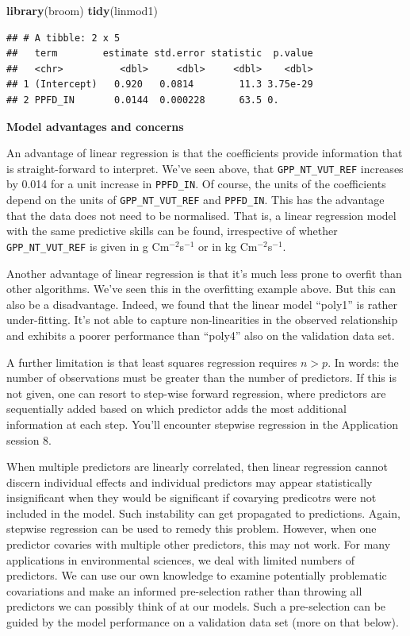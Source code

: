 \documentclass[
]{book}
\newenvironment{Shaded}{\begin{snugshade}}{\end{snugshade}}
\newcommand{\KeywordTok}[1]{\textcolor[rgb]{0.13,0.29,0.53}{\textbf{#1}}}
\newcommand{\NormalTok}[1]{#1}
\begin{document}
\begin{Shaded}
\begin{Highlighting}[]
\KeywordTok{library}\NormalTok{(broom)}
\KeywordTok{tidy}\NormalTok{(linmod1)}
\end{Highlighting}
\end{Shaded}

\begin{verbatim}
## # A tibble: 2 x 5
##   term        estimate std.error statistic  p.value
##   <chr>          <dbl>     <dbl>     <dbl>    <dbl>
## 1 (Intercept)   0.920   0.0814        11.3 3.75e-29
## 2 PPFD_IN       0.0144  0.000228      63.5 0.
\end{verbatim}

\textbf{Model advantages and concerns}

An advantage of linear regression is that the coefficients provide information that is straight-forward to interpret. We've seen above, that \texttt{GPP\_NT\_VUT\_REF} increases by 0.014 for a unit increase in \texttt{PPFD\_IN}. Of course, the units of the coefficients depend on the units of \texttt{GPP\_NT\_VUT\_REF} and \texttt{PPFD\_IN}. This has the advantage that the data does not need to be normalised. That is, a linear regression model with the same predictive skills can be found, irrespective of whether \texttt{GPP\_NT\_VUT\_REF} is given in g Cm\(^{-2}\)s\(^{-1}\) or in kg Cm\(^{-2}\)s\(^{-1}\).

Another advantage of linear regression is that it's much less prone to overfit than other algorithms. We've seen this in the overfitting example above. But this can also be a disadvantage. Indeed, we found that the linear model ``poly1'' is rather under-fitting. It's not able to capture non-linearities in the observed relationship and exhibits a poorer performance than ``poly4'' also on the validation data set.

A further limitation is that least squares regression requires \(n>p\). In words: the number of observations must be greater than the number of predictors. If this is not given, one can resort to step-wise forward regression, where predictors are sequentially added based on which predictor adds the most additional information at each step. You'll encounter stepwise regression in the Application session 8.

When multiple predictors are linearly correlated, then linear regression cannot discern individual effects and individual predictors may appear statistically insignificant when they would be significant if covarying predicotrs were not included in the model. Such instability can get propagated to predictions. Again, stepwise regression can be used to remedy this problem. However, when one predictor covaries with multiple other predictors, this may not work. For many applications in environmental sciences, we deal with limited numbers of predictors. We can use our own knowledge to examine potentially problematic covariations and make an informed pre-selection rather than throwing all predictors we can possibly think of at our models. Such a pre-selection can be guided by the model performance on a validation data set (more on that below).
\end{document}
